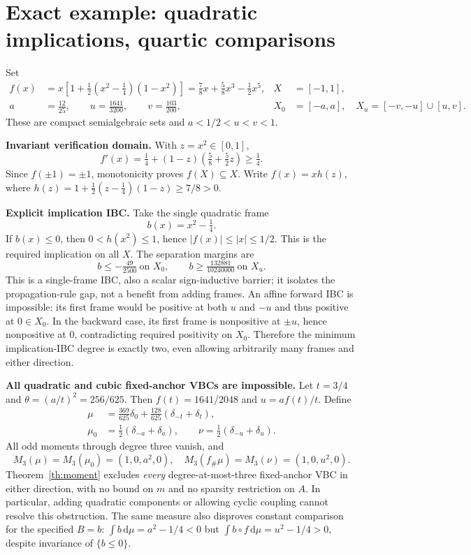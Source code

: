 \documentclass[10pt,letterpaper]{article}
\newcommand{\dd}{\,\mathrm d}
\begin{document}
\newpage
\section{Exact example: quadratic implications, quartic comparisons}
Set
\begin{align*}
 f(x)&=x\left[1+\tfrac12(x^2-\tfrac14)(1-x^2)\right]
       =\tfrac78x+\tfrac58x^3-\tfrac12x^5, & X&=[-1,1],\\
 a&=\tfrac{12}{25},\qquad u=\tfrac{1641}{3200},\qquad v=\tfrac{103}{200},
 &X_0&=[-a,a],\quad X_u=[-v,-u]\cup[u,v].
\end{align*}
These are compact semialgebraic sets and $a<1/2<u<v<1$.

\textbf{Invariant verification domain.} With $z=x^2\in[0,1]$,
\[
 f'(x)=\tfrac14+(1-z)(\tfrac58+\tfrac52z)\geq\tfrac14.
\]
Since $f(\pm1)=\pm1$, monotonicity proves $f(X)\subseteq X$. Write $f(x)=xh(z)$, where $h(z)=1+\tfrac12(z-\tfrac14)(1-z)\geq7/8>0$.

\textbf{Explicit implication IBC.} Take the single quadratic frame
\[
 b(x)=x^2-\tfrac14.
\]
If $b(x)\leq0$, then $0<h(x^2)\leq1$, hence $|f(x)|\leq|x|\leq1/2$. This is the required implication on all $X$. The separation margins are
\[
 b\leq-\tfrac{49}{2500}\ \text{on }X_0,\qquad
 b\geq\tfrac{132881}{10240000}\ \text{on }X_u.
\]
This is a single-frame IBC, also a scalar sign-inductive barrier; it isolates the propagation-rule gap, not a benefit from adding frames. An affine forward IBC is impossible: its first frame would be positive at both $u$ and $-u$ and thus positive at $0\in X_0$. In the backward case, its first frame is nonpositive at $\pm u$, hence nonpositive at $0$, contradicting required positivity on $X_0$. Therefore the minimum implication-IBC degree is exactly two, even allowing arbitrarily many frames and either direction.

\textbf{All quadratic and cubic fixed-anchor VBCs are impossible.} Let $t=3/4$ and $\theta=(a/t)^2=256/625$. Then $f(t)=1641/2048$ and $u=af(t)/t$. Define
\begin{align*}
 \mu&=\tfrac{369}{625}\delta_0+\tfrac{128}{625}(\delta_{-t}+\delta_t),\\
 \mu_0&=\tfrac12(\delta_{-a}+\delta_a),\qquad
 \nu=\tfrac12(\delta_{-u}+\delta_u).
\end{align*}
All odd moments through degree three vanish, and
\[
 M_3(\mu)=M_3(\mu_0)=(1,0,a^2,0),\quad
 M_3(f_\#\mu)=M_3(\nu)=(1,0,u^2,0).
\]
Theorem~\ref{th:moment} excludes \emph{every} degree-at-most-three fixed-anchor VBC in either direction, with no bound on $m$ and no sparsity restriction on $A$. In particular, adding quadratic components or allowing cyclic coupling cannot resolve this obstruction. The same measure also disproves constant comparison for the specified $B=b$: $\int b\dd\mu=a^2-1/4<0$ but $\int b\circ f\dd\mu=u^2-1/4>0$, despite invariance of $\{b\leq0\}$.
\end{document}
